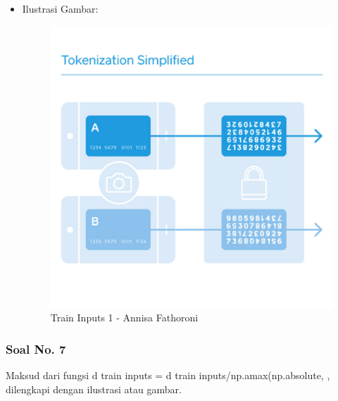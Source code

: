 \begin{itemize}
\item Ilustrasi Gambar:

    \begin{figure}[!hbtp]
    \centering
    \includegraphics[scale=0.4]{figures/Chapter 7/1164067/Teori/Chapter7AnnisaFathoroni1.jpg}
    \caption{Train Inputs 1 - Annisa Fathoroni}
    \label{Train Inputs 1 - Annisa Fathoroni}
    \end{figure}
\end{itemize}

\subsubsection{Soal No. 7}
Maksud dari fungsi d train inputs = d train inputs/np.amax(np.absolute, , dilengkapi dengan ilustrasi atau gambar.

